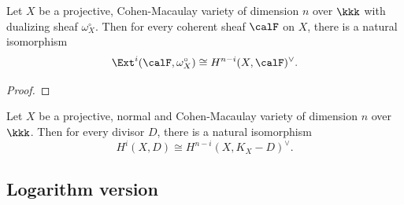     \begin{theorem}\label{thm:Serre_duality}
        Let \(X\) be a projective, Cohen-Macaulay variety of dimension \(n\) over \(\kkk\) with dualizing sheaf \(\omega_X^\circ\).
        Then for every coherent sheaf \(\calF\) on \(X\), there is a natural isomorphism
        \[ \Ext^i(\calF, \omega_X^\circ) \cong H^{n-i}(X, \calF)^\vee. \]
    \end{theorem}
    \begin{proof}
    \end{proof}


    \begin{corollary}\label{cor:Serre_duality_for_the_canonical_divisor}
        Let \(X\) be a projective, normal and Cohen-Macaulay variety of dimension \(n\) over \(\kkk\).
        Then for every divisor \(D\), there is a natural isomorphism
        \[ H^i(X, D) \cong H^{n-i}(X, K_X - D)^\vee. \]
    \end{corollary}

\subsection{Logarithm version}
